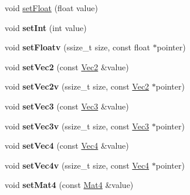 \textbf{ }\par
\begin{DoxyCompactItemize}
\item 
void \hyperlink{classUniformValue_a8d11e6e7ce795e5e29e9f1c2c6cbf8ff}{set\+Float} (float value)
\item 
\mbox{\label{classUniformValue_a433ec19d7a717ef63e666e7db125f699}} 
void {\bfseries set\+Int} (int value)
\item 
\mbox{\label{classUniformValue_a67a5f3b3fe655b4a80bfd6c26a4326c0}} 
void {\bfseries set\+Floatv} (ssize\+\_\+t size, const float $\ast$pointer)
\item 
\mbox{\label{classUniformValue_a279b4b728aa78eb4ceaea81be0fb4e87}} 
void {\bfseries set\+Vec2} (const \hyperlink{classVec2}{Vec2} \&value)
\item 
\mbox{\label{classUniformValue_abb5dfab75586b10e13081a32aa9b984e}} 
void {\bfseries set\+Vec2v} (ssize\+\_\+t size, const \hyperlink{classVec2}{Vec2} $\ast$pointer)
\item 
\mbox{\label{classUniformValue_a981c0b5ff1e7aa92418c39b3133a53a5}} 
void {\bfseries set\+Vec3} (const \hyperlink{classVec3}{Vec3} \&value)
\item 
\mbox{\label{classUniformValue_a90d5a06d96fa3953db8421a6f7ae962f}} 
void {\bfseries set\+Vec3v} (ssize\+\_\+t size, const \hyperlink{classVec3}{Vec3} $\ast$pointer)
\item 
\mbox{\label{classUniformValue_a548a0cd9505e4e3b2453e475cb5158b1}} 
void {\bfseries set\+Vec4} (const \hyperlink{classVec4}{Vec4} \&value)
\item 
\mbox{\label{classUniformValue_a2ef1f7cbb0068645d6cbf639ac743306}} 
void {\bfseries set\+Vec4v} (ssize\+\_\+t size, const \hyperlink{classVec4}{Vec4} $\ast$pointer)
\item 
\mbox{\label{classUniformValue_a3d4807b7fcb461d1041b3e139917a37f}} 
void {\bfseries set\+Mat4} (const \hyperlink{classMat4}{Mat4} \&value)
\end{DoxyCompactItemize}


